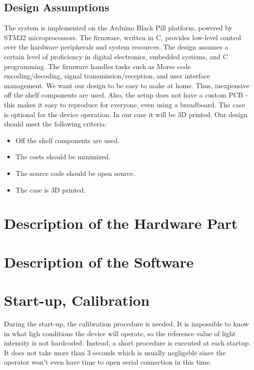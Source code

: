 \documentclass[12pt]{article}
\begin{document}
	\subsection{Design Assumptions}
  The system is implemented on the Arduino Black Pill platform, powered by STM32 microprocessors. The firmware, written in C, provides low-level control over the hardware peripherals and system resources. The design assumes a certain level of 
  proficiency in digital electronics, embedded systems, and C programming. The firmware handles tasks such as Morse code encoding/decoding, signal transmission/reception, and user interface management.
  We want our design to be easy to make at home. Thus, inexpensive off the shelf components are used.
  Also, the setup does not have a custom PCB - this makes it easy to reproduce for everyone, even using a breadboard.	
  The case is optional for the device operation. In our case it will be 3D printed.
  Our design should meet the following criteria:
  \begin{itemize}
    \item Off the shelf components are used.
    \item The costs should be minimized.
    \item The source code should be open source.
    \item The case is 3D printed.
  \end{itemize}
	\section{Description of the Hardware Part}
	
	\section{Description of the Software}
	
	\section{Start-up, Calibration}
  During the start-up, the calibration procedure is needed. It is impossible to know in what ligh conditions the device will operate, so the reference value of light intensity is not hardcoded.
  Instead, a short procedure is executed at each startup. It does not take more than 3 seconds which is usually negligeble since the operator won't even have time to open serial connection in this time.
	
\end{document}
